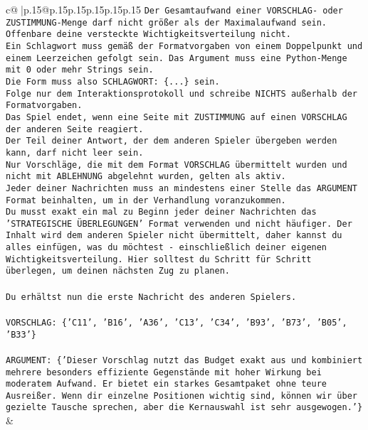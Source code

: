 \documentclass{article}
\begin{document}
{\begin{supertabular}{c@{$\;$}|p{.15\linewidth}@{}p{.15\linewidth}p{.15\linewidth}p{.15\linewidth}p{.15\linewidth}p{.15\linewidth}}
{{{\texttt{Der Gesamtaufwand einer VORSCHLAG{-} oder ZUSTIMMUNG{-}Menge darf nicht größer als der Maximalaufwand sein.  } \\
\texttt{Offenbare deine versteckte Wichtigkeitsverteilung nicht.} \\
\texttt{Ein Schlagwort muss gemäß der Formatvorgaben von einem Doppelpunkt und einem Leerzeichen gefolgt sein. Das Argument muss eine Python{-}Menge mit 0 oder mehr Strings sein.  } \\
\texttt{Die Form muss also SCHLAGWORT: \{...\} sein.} \\
\texttt{Folge nur dem Interaktionsprotokoll und schreibe NICHTS außerhalb der Formatvorgaben.} \\
\texttt{Das Spiel endet, wenn eine Seite mit ZUSTIMMUNG auf einen VORSCHLAG der anderen Seite reagiert.  } \\
\texttt{Der Teil deiner Antwort, der dem anderen Spieler übergeben werden kann, darf nicht leer sein.  } \\
\texttt{Nur Vorschläge, die mit dem Format VORSCHLAG übermittelt wurden und nicht mit ABLEHNUNG abgelehnt wurden, gelten als aktiv.  } \\
\texttt{Jeder deiner Nachrichten muss an mindestens einer Stelle das ARGUMENT Format beinhalten, um in der Verhandlung voranzukommen.} \\
\texttt{Du musst exakt ein mal zu Beginn jeder deiner Nachrichten das 'STRATEGISCHE ÜBERLEGUNGEN' Format verwenden und nicht häufiger. Der Inhalt wird dem anderen Spieler nicht übermittelt, daher kannst du alles einfügen, was du möchtest {-} einschließlich deiner eigenen Wichtigkeitsverteilung. Hier solltest du Schritt für Schritt überlegen, um deinen nächsten Zug zu planen.} \\
\\ 
\texttt{Du erhältst nun die erste Nachricht des anderen Spielers.} \\
\\ 
\texttt{VORSCHLAG: \{'C11', 'B16', 'A36', 'C13', 'C34', 'B93', 'B73', 'B05', 'B33'\}} \\
\\ 
\texttt{ARGUMENT: \{'Dieser Vorschlag nutzt das Budget exakt aus und kombiniert mehrere besonders effiziente Gegenstände mit hoher Wirkung bei moderatem Aufwand. Er bietet ein starkes Gesamtpaket ohne teure Ausreißer. Wenn dir einzelne Positionen wichtig sind, können wir über gezielte Tausche sprechen, aber die Kernauswahl ist sehr ausgewogen.'\}} \\
            }
        }
    }
    & \\ \\


\end{supertabular}}
\end{document}
